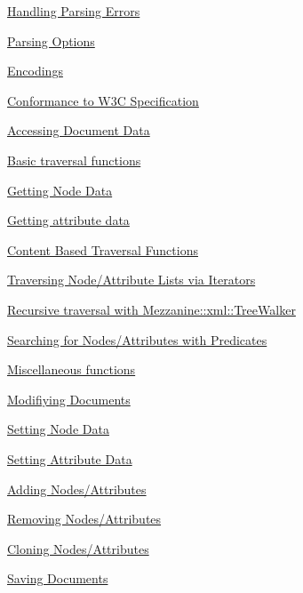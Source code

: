 \begin{DoxyItemize}
\begin{DoxyItemize}
\item \hyperlink{XMLManual_XMLLoadingErrors}{Handling Parsing Errors}
\item \hyperlink{XMLManual_XMLLoadingParsingOptions}{Parsing Options}
\item \hyperlink{XMLManual_XMLLoadingEncodings}{Encodings}
\item \hyperlink{XMLManual_XMLLoadingStandards}{Conformance to W3C Specification}
\end{DoxyItemize}
\item \hyperlink{XMLManual_XMLAccessing}{Accessing Document Data}
\begin{DoxyItemize}
\item \hyperlink{XMLManual_XMLAccessingBasics}{Basic traversal functions}
\item \hyperlink{XMLManual_XMLAccessingNodeData}{Getting Node Data}
\item \hyperlink{XMLManual_XMLAccessingAttributeData}{Getting attribute data}
\item \hyperlink{XMLManual_XMLAccessingContentBased}{Content Based Traversal Functions}
\item \hyperlink{XMLManual_XMLAccessingIterators}{Traversing Node/Attribute Lists via Iterators}
\item \hyperlink{XMLManual_XMLAccessingWalker}{Recursive traversal with Mezzanine::xml::TreeWalker}
\item \hyperlink{XMLManual_XMLAccessingPredicates}{Searching for Nodes/Attributes with Predicates}
\item \hyperlink{XMLManual_XMLAccessingMisc}{Miscellaneous functions}
\end{DoxyItemize}
\item \hyperlink{XMLManual_XMLModifying}{Modifiying Documents}
\begin{DoxyItemize}
\item \hyperlink{XMLManual_XMLModifyingNodeData}{Setting Node Data}
\item \hyperlink{XMLManual_XMLModifyingAttributeData}{Setting Attribute Data}
\item \hyperlink{XMLManual_XMLModifyingAdding}{Adding Nodes/Attributes}
\item \hyperlink{XMLManual_XMLModifyingRemoving}{Removing Nodes/Attributes}
\item \hyperlink{XMLManual_XMLModifyingCloning}{Cloning Nodes/Attributes}
\end{DoxyItemize}
\item \hyperlink{XMLManual_XMLSaving}{Saving Documents}

\end{DoxyItemize}
